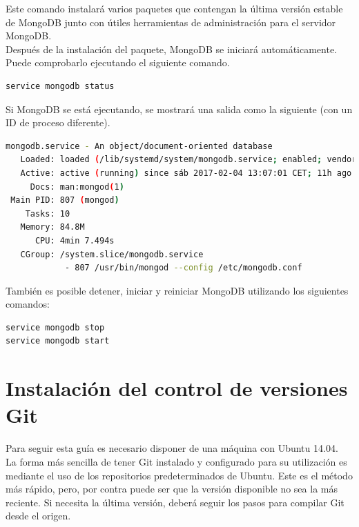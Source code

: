 \begin{appendix}
Este comando instalará varios paquetes que contengan la última versión estable de MongoDB junto con útiles herramientas de administración para el servidor MongoDB.\\

Después de la instalación del paquete, MongoDB se iniciará automáticamente. Puede comprobarlo ejecutando el siguiente comando.\\

\begin{lstlisting}[language=bash]
service mongodb status
\end{lstlisting}

Si MongoDB se está ejecutando, se mostrará una salida como la siguiente (con un ID de proceso diferente).\\

\begin{lstlisting}[language=bash]
 mongodb.service - An object/document-oriented database
   Loaded: loaded (/lib/systemd/system/mongodb.service; enabled; vendor preset: enabled)
   Active: active (running) since sáb 2017-02-04 13:07:01 CET; 11h ago
     Docs: man:mongod(1)
 Main PID: 807 (mongod)
    Tasks: 10
   Memory: 84.8M
      CPU: 4min 7.494s
   CGroup: /system.slice/mongodb.service
            - 807 /usr/bin/mongod --config /etc/mongodb.conf
\end{lstlisting}

También es posible detener, iniciar y reiniciar MongoDB utilizando los siguientes comandos:\\

\begin{lstlisting}[language=bash]
service mongodb stop
service mongodb start
\end{lstlisting}


\section{Instalación del control de versiones Git}

Para seguir esta guía es necesario disponer de una máquina con Ubuntu 14.04.\\

La forma más sencilla de tener Git instalado y configurado para su utilización es mediante el uso de los repositorios predeterminados de Ubuntu. 
Este es el método más rápido, pero, por contra puede ser que la versión disponible no sea la más reciente. 
Si necesita la última versión, deberá seguir los pasos para compilar Git desde el origen.\\


\end{appendix}
